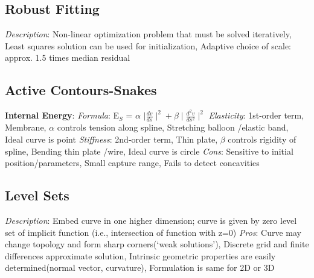 \documentclass{article}
\begin{document}
\begin{multicols*}{2}
        \subsection*{Robust Fitting}
        \textit{Description}: Non-linear optimization problem that must be solved iteratively, Least squares solution
        can be used for initialization, Adaptive choice of scale: approx. 1.5 times median residual\newline
        \subsection*{Active Contours-Snakes}
        \textbf{Internal Energy}:\newline
        \textit{Formula}: E$_{S}$ = $\alpha$ $\mid\frac{dv}{ds}\mid^2 + \beta\mid\frac{d^2v}{ds^2}\mid^2$\newline
        \textit{Elasticity}: 1st-order term, Membrane, $\alpha$ controls tension along spline, Stretching balloon
        /elastic band, Ideal curve is point\newline
        \textit{Stiffness}: 2nd-order term, Thin plate, $\beta$ controls rigidity of spline, Bending thin plate
        /wire, Ideal curve is circle\newline
        \textit{Cons}: Sensitive to initial position/parameters, Small capture range, Fails to detect
        concavities\newline
        \subsection*{Level Sets}
        \textit{Description}: Embed curve in one higher dimension; curve is given by zero level set of implicit
        function (i.e., intersection of function with z=0)\newline
        \textit{Pros}: Curve may change topology and form sharp corners(\textquoteleft weak solutions\textquoteright),
        Discrete grid and finite differences approximate solution, Intrinsic geometric properties are easily
        determined(normal vector, curvature), Formulation is same for 2D or 3D\newline

\end{multicols*}
\end{document}
